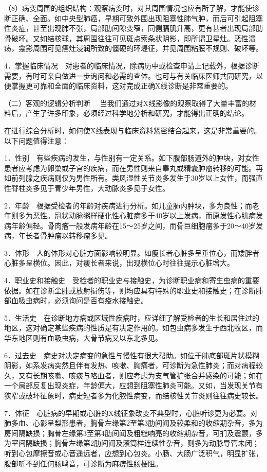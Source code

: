 （8）病变周围的组织结构：观察病变时，对其周围情况也应有所了解，才能使诊断正确、全面。如中央型肺癌，早期可致外围出现阻塞性肺气肿，而后可引起阻塞性炎症，甚至出现肺不张，局部肋间隙变窄，同侧膈肌升高，更有甚者出现局部肋骨破坏。又如结核球，其周围往往可见斑点索条状阴影，即所谓卫星灶。恶性溃疡，龛影周围可见癌灶浸润所致的僵硬的环堤征，并见周围粘膜不规则、破坏等。

4．掌握临床情况　对患者的临床情况，除病历中或检查申请上记载外，根据诊断需要，有时可亲自做进一步询问和必需的查体。也可与有关临床医师共同研究，以便掌握更可靠和全面的临床资料，这对完成正确X线诊断是非常重要的。

（二）{客观的逻辑分析判断}
　当我们通过对X线影像的观察取得了大量丰富的材料后，产生了许多印象，必须经过科学地分析和研究，才能得出正确的结论。

在进行综合分析时，如何使X线表现与临床资料紧密结合起来，这是非常重要的。以下问题值得注意：

1．性别　有些疾病的发生，与性别有一定关系。如下腹部肠道外的肿块，对女性患者应考虑为卵巢或子宫的疾病，而在男性则来自睾丸或精囊肿瘤转移的可能。再如前列腺之疾病则仅为男性所有。类风湿性关节炎多发生于30岁以上女性，而强直性脊柱炎多见于青少年男性，大动脉炎多见于女性。

2．年龄　根据受检者的年龄对疾病进行分析。如儿童肺内肿块，多为良性；而老年则多为恶性。冠状动脉粥样硬化性心脏病多于40岁以上发病，而原发性心肌病发病年龄偏轻。骨肉瘤一般发病年龄在15～25岁之间，而骨巨细胞瘤多于20～40岁发病，年长者骨肿瘤以转移瘤多见。

3．体形　人的体形对心脏方面影响较明显。如瘦长者心脏多呈垂位心，而矮胖者心脏多呈横位。因此，对瘦长者来说，出现横位心时往往提示心脏增大。

4．职业史和接触史　受检者的职业史与接触史，为诊断职业病和寄生虫病的重要依据。如在诊断尘肺或放射损伤等，则均应具有特殊的职业史和接触史；在诊断肺部血吸虫病时，必须询问是否有疫水接触史。

5．生活史　在诊断地方病或区域性疾病时，应详细了解受检者的生长和居住过的地区，这对确定某些疾病的性质是有决定作用的。如包虫病多发生于西北牧区，而华东地区则有血吸虫病，大骨节病又以东北多见。

6．过去史　病史对决定病变的急性与慢性有很大帮助。如位于肺底部斑片状模糊阴影，如系发病突然且伴有发热、咳嗽、胸痛者，可诊断为急性肺炎；而对病程较久，又有长期咳嗽、咳痰与咯血者，则应考虑为支气管扩张合并感染的可能；如在一个局部反复出现炎症，年龄偏大，应想到阻塞性肺炎可能。又如，当发现关节有狭窄或破坏征象时，病史短者多为化脓性病变，而结核性关节炎则往往病史较长。

7．体征　心脏病的早期或心脏的X线征象改变不典型时，心脏听诊更为必要。对肺多血、心影呈梨形患者，胸骨左缘第2至第3肋间闻及较柔和的收缩期杂音，多为房间隔缺损；胸骨左缘第3至第4肋间闻及粗糙响亮的收缩期杂音，可扪及震颤，多为室间隔缺损；胸骨左缘第2肋间闻及滚筒样连续性杂音，则多为动脉导管未闭；听到心包摩擦音或心音遥远者，应想到心包炎。小肠、大肠广泛积气，明显扩张，腹部听不到任何肠鸣音，可诊断为麻痹性肠梗阻。

